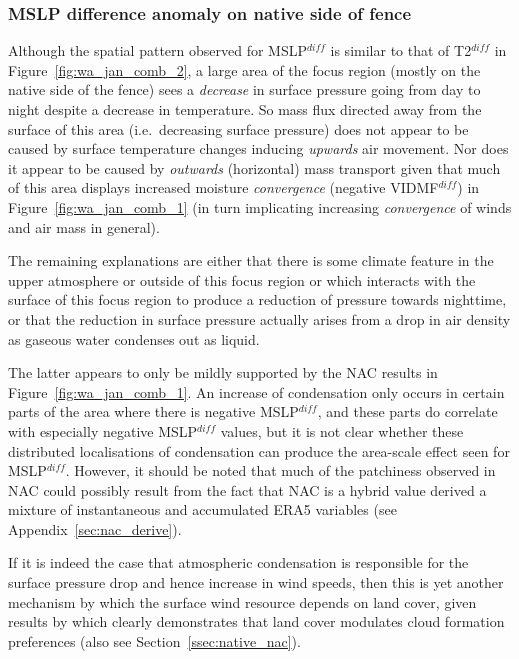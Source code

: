 \subsubsection{MSLP difference anomaly on native side of fence}

Although the spatial pattern observed for \ac{MSLP}$^{diff}$ is similar to that of \ac{T2}$^{diff}$ in Figure~\ref{fig:wa_jan_comb_2}, a large area of the focus region (mostly on the native side of the fence) sees a \textit{decrease} in surface pressure going from day to night despite a decrease in temperature. So mass flux directed away from the surface of this area (i.e.\ decreasing surface pressure) does not appear to be caused by surface temperature changes inducing \textit{upwards} air movement. Nor does it appear to be caused by \textit{outwards} (horizontal) mass transport given that much of this area displays increased moisture \textit{convergence} (negative \acs{VIDMF}$^{diff}$) in Figure~\ref{fig:wa_jan_comb_1} (in turn implicating increasing \textit{convergence} of winds and air mass in general).

The remaining explanations are either that there is some climate feature in the upper atmosphere or outside of this focus region or which interacts with the surface of this focus region to produce a reduction of pressure towards nighttime, or that the reduction in surface pressure actually arises from a drop in air density as gaseous water condenses out as liquid.

The latter appears to only be mildly supported by the \ac{NAC} results in Figure~\ref{fig:wa_jan_comb_1}. An increase of condensation only occurs in certain parts of the area where there is negative \ac{MSLP}$^{diff}$, and these parts do correlate with especially negative \ac{MSLP}$^{diff}$ values, but it is not clear whether these distributed localisations of condensation can produce the area-scale effect seen for \ac{MSLP}$^{diff}$. However, it should be noted that much of the patchiness observed in \ac{NAC} could possibly result from the fact that \ac{NAC} is a hybrid value derived a mixture of instantaneous and accumulated \ac{ERA5} variables (see Appendix~\ref{sec:nac_derive}).

If it is indeed the case that atmospheric condensation is responsible for the surface pressure drop and hence increase in wind speeds, then this is yet another mechanism by which the surface wind resource depends on land cover, given results by \citep{lyons2002, ray2003} which clearly demonstrates that land cover modulates cloud formation preferences (also see Section~\ref{ssec:native_nac}).

